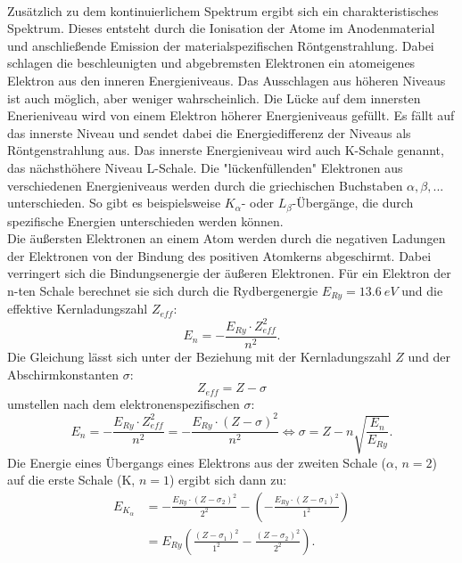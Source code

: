 \\Zusätzlich zu dem kontinuierlichem Spektrum ergibt sich ein charakteristisches Spektrum.
Dieses entsteht durch die Ionisation der Atome im Anodenmaterial und anschließende Emission der materialspezifischen Röntgenstrahlung.
Dabei schlagen die beschleunigten und abgebremsten Elektronen ein atomeigenes Elektron aus den inneren Energieniveaus.
Das Ausschlagen aus höheren Niveaus ist auch möglich, aber weniger wahrscheinlich.
Die Lücke auf dem innersten Enerieniveau wird von einem Elektron höherer Energieniveaus gefüllt.
Es fällt auf das innerste Niveau und sendet dabei die Energiedifferenz der Niveaus als Röntgenstrahlung aus.
Das innerste Energieniveau wird auch K-Schale genannt, das nächsthöhere Niveau L-Schale.
Die "lückenfüllenden" Elektronen aus verschiedenen Energieniveaus werden durch die griechischen Buchstaben $\alpha, \beta,...$ unterschieden.
So gibt es beispielsweise $K_{\alpha}$- oder $L_{\beta}$-Übergänge, die durch spezifische Energien unterschieden werden können.
\\Die äußersten Elektronen an einem Atom werden durch die negativen Ladungen der Elektronen von der Bindung des positiven Atomkerns abgeschirmt.
Dabei verringert sich die Bindungsenergie der äußeren Elektronen.
Für ein Elektron der n-ten Schale berechnet sie sich durch die Rydbergenergie $E_{Ry}=\SI{13.6}{eV}$ und die effektive Kernladungszahl $Z_{eff}$:
\begin{equation*}
  E_n= - \frac{E_{Ry}\cdot Z_{eff}^2}{n^2}.
\end{equation*}
Die Gleichung lässt sich unter der Beziehung mit der Kernladungszahl $Z$ und der Abschirmkonstanten $\sigma$:
\begin{equation*}
  Z_{eff}=Z-\sigma
\end{equation*}
umstellen nach dem elektronenspezifischen $\sigma$:
\begin{equation}
  E_n= - \frac{E_{Ry}\cdot Z_{eff}^2}{n^2} = - \frac{E_{Ry}\cdot (Z-\sigma)^2}{n^2} \Leftrightarrow \sigma= Z-n\sqrt{\frac{E_{n}}{E_{Ry}}}.
  \label{eqn:E}
\end{equation}
Die Energie eines Übergangs eines Elektrons aus der zweiten Schale ($\alpha$, $n=2$) auf die erste Schale (K, $n=1$) ergibt sich dann zu:
\begin{align}
  E_{K_{\alpha}}&= - \frac{E_{Ry}\cdot (Z-\sigma_{2})^2}{2^2} - \left( - \frac{E_{Ry}\cdot (Z-\sigma_{1})^2}{1^2} \right)\\
  &= E_{Ry} \left(\frac{(Z-\sigma_{1})^2}{1^{2}} - \frac{(Z-\sigma_{2})^2}{2^{2}} \right) .
  \label{eqn:E2}
\end{align}
